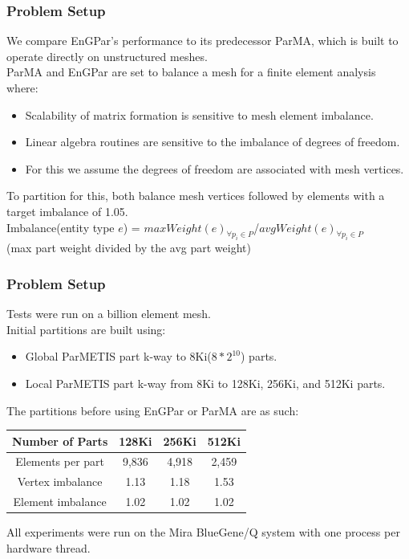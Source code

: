 \documentclass{beamer}
\begin{document}
\begin{frame}
  \frametitle{Problem Setup}
  We compare EnGPar's performance to its predecessor ParMA, which is built to operate directly on unstructured meshes.\\
  \medskip
  ParMA and EnGPar are set to balance a mesh for a finite element analysis where:
  \begin{itemize}
  \item Scalability of matrix formation is sensitive to mesh element imbalance.
  \item Linear algebra routines are sensitive to the imbalance of degrees of freedom.
  \item For this we assume the degrees of freedom are associated with mesh vertices.
  \end{itemize}
  \bigskip
  To partition for this, both balance mesh vertices followed by elements with a
  target imbalance of 1.05. \\
  Imbalance(entity type $e$) = 
  $maxWeight(e)_{\forall p_{i} \in P}$/$avgWeight(e)_{\forall p_{i} \in P}$ \\
  (max part weight divided by the avg part weight) 
\end{frame}

\begin{frame}
  \frametitle{Problem Setup}
  \medskip
  Tests were run on a billion element mesh. \\
  \medskip
  Initial partitions are built using:
  \begin{itemize}
  \item Global ParMETIS part k-way to 8Ki($8*2^{10}$) parts.
  \item Local ParMETIS part k-way from 8Ki to 128Ki, 256Ki, and 512Ki parts.
  \end{itemize}
  The partitions before using EnGPar or ParMA are as such:\\
  \begin{table}[!h]
    \centering
    \begin{tabular}{||c|c|c|c||}
      \hline
      Number of Parts &128Ki&256Ki&512Ki \\
      \hline
      Elements per part & 9,836 & 4,918&2,459  \\
      \hline
      Vertex imbalance & 1.13 & 1.18 & 1.53 \\
      \hline
      Element imbalance & 1.02& 1.02& 1.02\\
      \hline
    \end{tabular}
  \end{table}
  All experiments were run on the Mira BlueGene/Q system with one process per hardware thread.
\end{frame}
\end{document}
